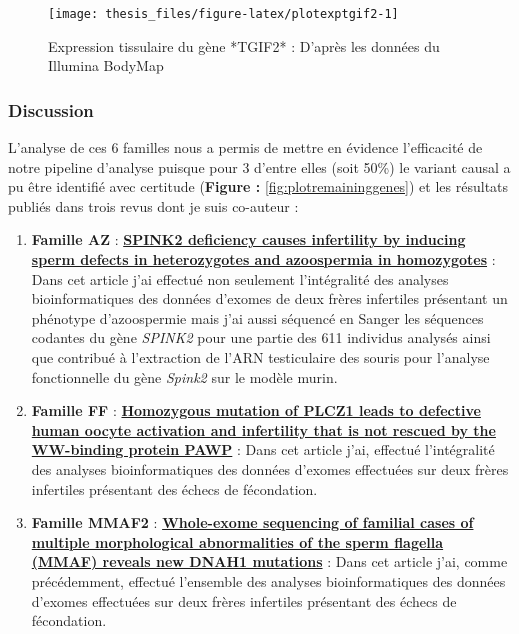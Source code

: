 \documentclass[12pt,twoside]{reedthesis}
\providecommand{\tightlist}{%
  \setlength{\itemsep}{0pt}\setlength{\parskip}{0pt}}
\theoremstyle{definition}
\theoremstyle{definition}
\theoremstyle{remark}
\begin{document}
  \newpage 
  
  \begin{figure}
  
  {\centering \texttt{[image: thesis\_files/figure-latex/plotexptgif2-1]} 
  
  }
  
  \caption[Expression tissulaire du gène *TGIF2*]{Expression tissulaire du gène *TGIF2* : D'après les données du Illumina BodyMap}\label{fig:plotexptgif2}
  \end{figure}
  
  \newpage
  
  \subsubsection{Discussion}\label{discussion}
  
  L'analyse de ces 6 familles nous a permis de mettre en évidence
  l'efficacité de notre pipeline d'analyse puisque pour 3 d'entre elles
  (soit 50\%) le variant causal a pu être identifié avec certitude
  (\textbf{Figure : }\ref{fig:plotremaininggenes}) et les résultats
  publiés dans trois revus dont je suis co-auteur :
  
  \begin{enumerate}
  \def\labelenumi{\arabic{enumi}.}
  \tightlist
  \item
    \textbf{Famille AZ} : \protect\hyperlink{spink2}{\textbf{SPINK2
    deficiency causes infertility by inducing sperm defects in
    heterozygotes and azoospermia in homozygotes}} : Dans cet article j'ai
    effectué non seulement l'intégralité des analyses bioinformatiques des
    données d'exomes de deux frères infertiles présentant un phénotype
    d'azoospermie mais j'ai aussi séquencé en Sanger les séquences
    codantes du gène \emph{SPINK2} pour une partie des 611 individus
    analysés ainsi que contribué à l'extraction de l'ARN testiculaire des
    souris pour l'analyse fonctionnelle du gène \emph{Spink2} sur le
    modèle murin.\\
  \item
    \textbf{Famille FF} : \protect\hyperlink{plcz}{\textbf{Homozygous
    mutation of PLCZ1 leads to defective human oocyte activation and
    infertility that is not rescued by the WW-binding protein PAWP}} :
    Dans cet article j'ai, effectué l'intégralité des analyses
    bioinformatiques des données d'exomes effectuées sur deux frères
    infertiles présentant des échecs de fécondation.\\
  \item
    \textbf{Famille MMAF2} :
    \protect\hyperlink{famdnah1}{\textbf{Whole-exome sequencing of
    familial cases of multiple morphological abnormalities of the sperm
    flagella (MMAF) reveals new DNAH1 mutations}} : Dans cet article j'ai,
    comme précédemment, effectué l'ensemble des analyses bioinformatiques
    des données d'exomes effectuées sur deux frères infertiles présentant
    des échecs de fécondation.
  \end{enumerate}
  
\end{document}

